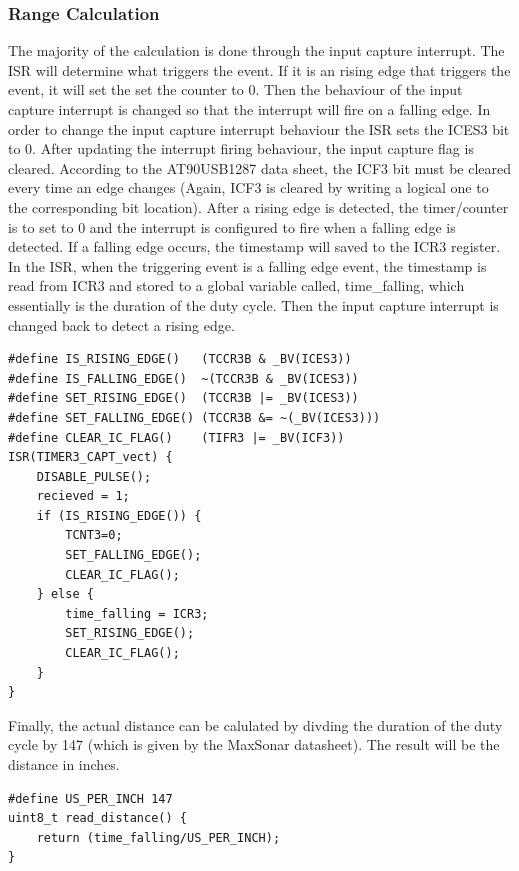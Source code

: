 \subsubsection{Range Calculation}
The majority of the calculation is done through the input capture interrupt. The ISR will determine what triggers the event. If it is an rising edge that triggers the event, it will set the set the counter to 0. Then the behaviour of the input capture interrupt is changed so that the interrupt will fire on a falling edge. In order to change the input capture interrupt behaviour the ISR sets the ICES3 bit to 0. After updating the interrupt firing behaviour, the input capture flag is cleared. According to the AT90USB1287 data sheet, the ICF3 bit must be cleared every time an edge changes (Again, ICF3 is cleared by writing a logical one to the corresponding bit location). After a rising edge is detected, the timer/counter is to set to 0 and the interrupt is configured to fire when a falling edge is detected. If a falling edge occurs, the timestamp will saved to the ICR3 register. In the ISR, when the triggering event is a falling edge event, the timestamp is read from ICR3 and stored to a global variable called, time\_falling, which essentially is the duration of the duty cycle. Then the input capture interrupt is changed back to detect a rising edge.

\begin{lstlisting}
#define IS_RISING_EDGE()   (TCCR3B & _BV(ICES3))
#define IS_FALLING_EDGE()  ~(TCCR3B & _BV(ICES3))
#define SET_RISING_EDGE()  (TCCR3B |= _BV(ICES3))                          
#define SET_FALLING_EDGE() (TCCR3B &= ~(_BV(ICES3)))                       
#define CLEAR_IC_FLAG()    (TIFR3 |= _BV(ICF3))
ISR(TIMER3_CAPT_vect) {
	DISABLE_PULSE();                                        
	recieved = 1;
	if (IS_RISING_EDGE()) {
		TCNT3=0;
		SET_FALLING_EDGE();
		CLEAR_IC_FLAG();
	} else {
		time_falling = ICR3;                    
		SET_RISING_EDGE();
		CLEAR_IC_FLAG();
	}	
}
\end{lstlisting}

Finally, the actual distance can be calulated by divding the duration of the duty cycle by 147 (which is given by the MaxSonar datasheet). The result will be the distance in inches.

\begin{lstlisting}
#define US_PER_INCH 147
uint8_t read_distance() {
	return (time_falling/US_PER_INCH);      
}
\end{lstlisting}

